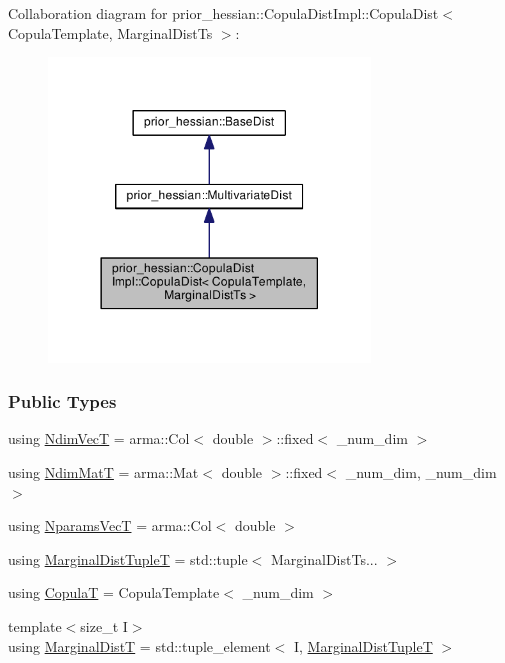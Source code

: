 Collaboration diagram for prior\+\_\+hessian\+:\+:Copula\+Dist\+Impl\+:\+:Copula\+Dist$<$ Copula\+Template, Marginal\+Dist\+Ts $>$\+:\nopagebreak
\begin{figure}[H]
\begin{center}
\leavevmode
\includegraphics[width=242pt]{classprior__hessian_1_1CopulaDistImpl_1_1CopulaDist__coll__graph}
\end{center}
\end{figure}
\subsubsection*{Public Types}
\begin{DoxyCompactItemize}
\item 
using \hyperlink{classprior__hessian_1_1CopulaDistImpl_1_1CopulaDist_a94fa53fddcc81dcefec387f68294472d}{Ndim\+VecT} = arma\+::\+Col$<$ double $>$\+::fixed$<$ \+\_\+num\+\_\+dim $>$
\item 
using \hyperlink{classprior__hessian_1_1CopulaDistImpl_1_1CopulaDist_a7f046aa9054ecf384b9f4ae157acfa49}{Ndim\+MatT} = arma\+::\+Mat$<$ double $>$\+::fixed$<$ \+\_\+num\+\_\+dim, \+\_\+num\+\_\+dim $>$
\item 
using \hyperlink{classprior__hessian_1_1CopulaDistImpl_1_1CopulaDist_ab23894c0a0c555b0b759e3c77df6a987}{Nparams\+VecT} = arma\+::\+Col$<$ double $>$
\item 
using \hyperlink{classprior__hessian_1_1CopulaDistImpl_1_1CopulaDist_acf46fae43d481ed82a2147433e5f2ff6}{Marginal\+Dist\+TupleT} = std\+::tuple$<$ Marginal\+Dist\+Ts... $>$
\item 
using \hyperlink{classprior__hessian_1_1CopulaDistImpl_1_1CopulaDist_a5525f8d14c3a1b3caf2f09d0e86a650f}{CopulaT} = Copula\+Template$<$ \+\_\+num\+\_\+dim $>$
\item 
{\footnotesize template$<$size\+\_\+t I$>$ }\\using \hyperlink{classprior__hessian_1_1CopulaDistImpl_1_1CopulaDist_aa2817fd47846a28d6b751940ab1b0376}{Marginal\+DistT} = std\+::tuple\+\_\+element$<$ I, \hyperlink{classprior__hessian_1_1CopulaDistImpl_1_1CopulaDist_acf46fae43d481ed82a2147433e5f2ff6}{Marginal\+Dist\+TupleT} $>$
\end{DoxyCompactItemize}
